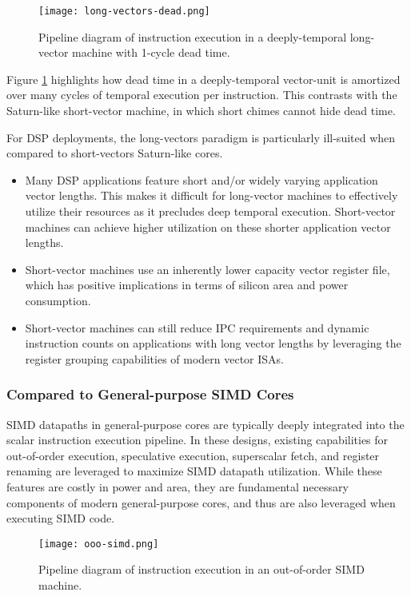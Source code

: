 \begin{figure}[h]
  \centering
  \texttt{[image: long-vectors-dead.png]}
  \caption{Pipeline diagram of instruction execution in a deeply-temporal long-vector machine with 1-cycle dead time.}
  \label{fig:long-dead}
\end{figure}

Figure \ref{fig:long-dead} highlights how dead time in a deeply-temporal vector-unit is amortized over many cycles of temporal execution per instruction.
This contrasts with the Saturn-like short-vector machine, in which short chimes cannot hide dead time.

For DSP deployments, the long-vectors paradigm is particularly ill-suited when compared to short-vectors Saturn-like cores.

\begin{itemize}
\item Many DSP applications feature short and/or widely varying application vector lengths. This makes it difficult for long-vector machines to effectively utilize their resources as it precludes deep temporal execution. Short-vector machines can achieve higher utilization on these shorter application vector lengths.
\item Short-vector machines use an inherently lower capacity vector register file, which has positive implications in terms of silicon area and power consumption.
\item Short-vector machines can still reduce IPC requirements and dynamic instruction counts on applications with long vector lengths by leveraging the register grouping capabilities of modern vector ISAs.
\end{itemize}

\subsubsection{Compared to General-purpose SIMD Cores}

SIMD datapaths in general-purpose cores are typically deeply integrated into the scalar instruction execution pipeline.
In these designs, existing capabilities for out-of-order execution, speculative execution, superscalar fetch, and register renaming are leveraged to maximize SIMD datapath utilization.
While these features are costly in power and area, they are fundamental necessary components of modern general-purpose cores, and thus are also leveraged when executing SIMD code.

\begin{figure}[h]
  \centering
  \texttt{[image: ooo-simd.png]}
  \caption{Pipeline diagram of instruction execution in an out-of-order SIMD machine.}
  \label{fig:ooo}
\end{figure}

